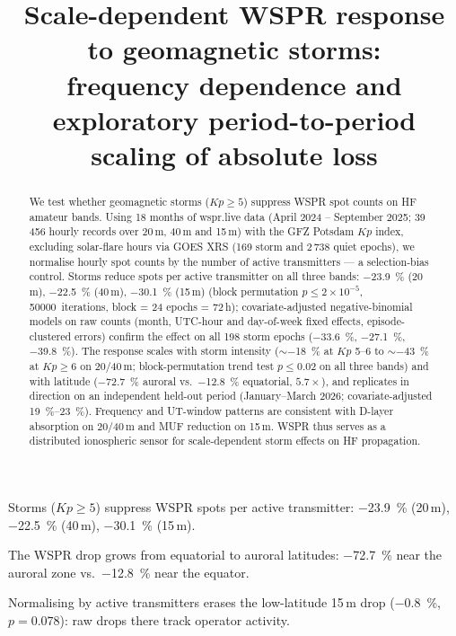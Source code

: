 \documentclass{agujournal2019}
\begin{document}
\title{Scale-dependent WSPR response to geomagnetic storms: \\
	frequency dependence and exploratory period-to-period scaling of absolute loss}



\linenumbers
\maketitle
\begin{keypoints}
	\item Storms ($Kp \ge 5$) suppress WSPR spots per active transmitter:
	\SI{-23.9}{\percent} (20\,m), \SI{-22.5}{\percent} (40\,m),
	\SI{-30.1}{\percent} (15\,m).
	\item The WSPR drop grows from equatorial to auroral latitudes:
	\SI{-72.7}{\percent} near the auroral zone vs.\ \SI{-12.8}{\percent}
	near the equator.
	\item Normalising by active transmitters erases the low-latitude 15\,m
	drop (\SI{-0.8}{\percent}, $p = 0.078$): raw drops there track operator
	activity.
\end{keypoints}

\begin{abstract}
	We test whether geomagnetic storms ($Kp \ge 5$) suppress WSPR spot counts on
	HF amateur bands. Using 18 months of wspr.live data (April 2024 -- September
	2025; 39\,456 hourly records over 20\,m, 40\,m and 15\,m) with the GFZ
	Potsdam $Kp$ index, excluding solar-flare hours via GOES XRS (169 storm and
	2\,738 quiet epochs), we normalise hourly spot counts by the number of
	active transmitters --- a selection-bias control. Storms reduce spots per
	active transmitter on all three bands: \SI{-23.9}{\percent} (20\,m),
	\SI{-22.5}{\percent} (40\,m), \SI{-30.1}{\percent} (15\,m) (block
	permutation $p \le 2 \times 10^{-5}$, \SI{50000}{iterations}, block = 24
	epochs = 72\,h); covariate-adjusted negative-binomial models on raw counts
	(month, UTC-hour and day-of-week fixed effects, episode-clustered errors)
	confirm the effect on all 198 storm epochs (\SI{-33.6}{\percent},
	\SI{-27.1}{\percent}, \SI{-39.8}{\percent}). The response scales with
	storm intensity
	($\sim$\SI{-18}{\percent} at $Kp$ 5--6 to $\sim$\SI{-43}{\percent} at
	$Kp \ge 6$ on 20/40\,m; block-permutation trend test $p \le 0.02$ on all
	three bands) and with latitude (\SI{-72.7}{\percent} auroral vs.\
	\SI{-12.8}{\percent} equatorial, $5.7\times$), and replicates in direction
	on an independent held-out period (January--March 2026;
	covariate-adjusted \SIrange{19}{23}{\percent}). Frequency and UT-window
	patterns are consistent with D-layer absorption on 20/40\,m and MUF
	reduction on 15\,m. WSPR thus serves as a distributed ionospheric sensor
	for scale-dependent storm effects on HF propagation.
\end{abstract}
\end{document}
